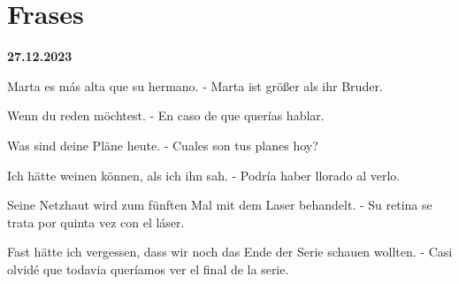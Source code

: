 \chapter{Frases}
\begin{frases}
    \item \textbf{27.12.2023}
    \item Marta es más alta que su hermano. - Marta ist größer
    als ihr Bruder.
    \item Wenn du reden möchtest. - En caso de que quer\'ias hablar.
    \item Was sind deine Pläne heute. - Cuales son tus planes hoy?
    \item Ich hätte weinen können, als ich ihn sah. - Podr\'ia haber llorado al 
    verlo.
    \item Seine Netzhaut wird zum fünften Mal mit dem Laser behandelt. - 
    Su retina se trata por quinta vez con el l\'aser.
    \item Fast hätte ich vergessen, dass wir noch das Ende der Serie schauen 
    wollten. - Casi olvid\'e que todavia quer\'iamos ver el final de la serie.
\end{frases}